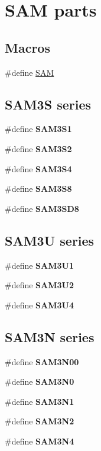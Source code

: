 \hypertarget{group__sam__part__macros__group}{\section{S\-A\-M parts}
\label{group__sam__part__macros__group}
}
\subsection*{Macros}
\begin{DoxyCompactItemize}
\item 
\#define \hyperlink{group__sam__part__macros__group_ga0184d5fd98854f0e40eef3a27de91fed}{S\-A\-M}
\end{DoxyCompactItemize}
\subsection*{S\-A\-M3\-S series}
\begin{DoxyCompactItemize}
\item 
\#define {\bfseries S\-A\-M3\-S1}
\item 
\#define {\bfseries S\-A\-M3\-S2}
\item 
\#define {\bfseries S\-A\-M3\-S4}
\item 
\#define {\bfseries S\-A\-M3\-S8}
\item 
\#define {\bfseries S\-A\-M3\-S\-D8}
\end{DoxyCompactItemize}
\subsection*{S\-A\-M3\-U series}
\begin{DoxyCompactItemize}
\item 
\#define {\bfseries S\-A\-M3\-U1}
\item 
\#define {\bfseries S\-A\-M3\-U2}
\item 
\#define {\bfseries S\-A\-M3\-U4}
\end{DoxyCompactItemize}
\subsection*{S\-A\-M3\-N series}
\begin{DoxyCompactItemize}
\item 
\#define {\bfseries S\-A\-M3\-N00}
\item 
\#define {\bfseries S\-A\-M3\-N0}
\item 
\#define {\bfseries S\-A\-M3\-N1}
\item 
\#define {\bfseries S\-A\-M3\-N2}
\item 
\#define {\bfseries S\-A\-M3\-N4}
\end{DoxyCompactItemize}
